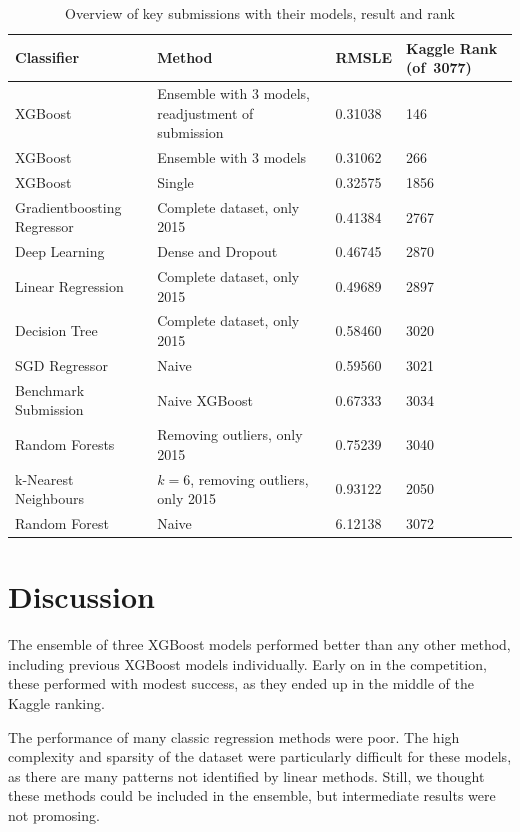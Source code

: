 \documentclass[a4paper,11pt,twocolumn]{article}
\begin{document}
\begin{table}[ht]
    \centering
    \begin{tabular}{| p{} | p{} | p{} |
    p{}|}
    \hline
    \textbf{Classifier} & \textbf{Method} & \textbf{RMSLE} & \textbf{Kaggle Rank
    (of~3077)} \\
    \hline
    XGBoost & Ensemble with 3 models, readjustment of submission & 0.31038 & 146 \\
    \hline
    XGBoost & Ensemble with 3 models & 0.31062 & 266 \\
    \hline
    XGBoost & Single & 0.32575 & 1856 \\
    \hline
    Gradientboosting Regressor & Complete dataset, only 2015 & 0.41384 & 2767 \\
    \hline
    Deep Learning & Dense and Dropout & 0.46745 & 2870 \\
    \hline
    Linear Regression & Complete dataset, only 2015 & 0.49689 & 2897 \\
    \hline
    Decision Tree & Complete dataset, only 2015 & 0.58460 & 3020 \\
    \hline
    SGD Regressor & Naive & 0.59560 & 3021 \\
    \hline
    Benchmark Submission & Naive XGBoost & 0.67333 & 3034 \\
    \hline
    Random Forests & Removing outliers, only 2015 & 0.75239 & 3040 \\
    \hline
    k-Nearest Neighbours & $k = 6$, removing outliers, only 2015 & 0.93122 &
    2050 \\
    \hline
    Random Forest & Naive & 6.12138 & 3072 \\
    \hline
    \end{tabular}
\caption{Overview of key submissions with their models, result and rank}
\label{tbl:xval}
\end{table}

\section{Discussion}
The ensemble of three XGBoost models performed better than any other method,
including previous XGBoost models individually. Early on in the competition,
these performed with modest success, as they ended up in the middle of the
Kaggle ranking.

The performance of many classic regression methods were poor. The high
complexity and sparsity of the dataset were particularly difficult for these
models, as there are many patterns not identified by linear methods. Still, we
thought these methods could be included in the ensemble, but intermediate
results were not promosing.
\end{document}
